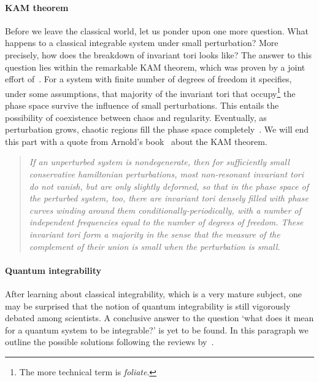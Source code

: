 \paragraph{KAM theorem}Before we leave the classical world, let us ponder upon one more question.
What happens to a classical integrable system under small perturbation? More precisely,
how does the breakdown of invariant tori looks like? The answer to this question lies
within the remarkable KAM theorem, which was proven by a joint effort
of~\textcite{Kolmogorov1954,Moser1962,Arnold1963}. For
a system with finite number of degrees of freedom it specifies, under some assumptions,
that majority of the invariant tori that occupy\footnote{The more technical term is
\textit{foliate}.} the phase space survive the influence of small perturbations. This entails
the possibility of coexistence between chaos and regularity. Eventually, as perturbation grows,
chaotic regions fill the phase space completely~\autocite{DAlessio2016}. We will end this part
with a quote from Arnold's book~\autocite{arnold2013mathematical} about the KAM theorem.
\begin{quotation}
   \textit{ If an unperturbed system is nondegenerate, then for sufficiently
small conservative hamiltonian perturbations, most non-resonant invariant
tori do not vanish, but are only slightly deformed, so that in the phase space
of the perturbed system, too, there are invariant tori densely filled with phase
curves winding around them conditionally-periodically, with a number of
independent frequencies equal to the number of degrees of freedom.
These invariant tori form a majority in the sense that the measure of the
complement of their union is small when the perturbation is small.}
\end{quotation}
\paragraph{Quantum integrability} After learning about classical integrability, which
is a very mature subject, one may be surprised that the notion of quantum integrability 
is still vigorously debated among scientists. A conclusive answer to the question
`what does it mean for a quantum system to be integrable?' is yet to be found.
In this paragraph we outline the possible solutions following the reviews
by~\textcite{Caux2011,Yuzbashyan2013}.

